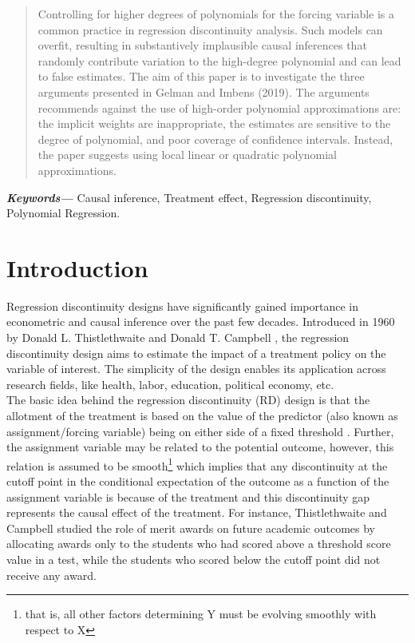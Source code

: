 \documentclass[fleqn]{article}
\providecommand{\keywords}[1]
{
  \small	
  \textbf{\textit{Keywords---}} #1
}
\begin{document}
\begin{abstract}
     Controlling for higher degrees of polynomials for the forcing variable is a common practice in regression discontinuity analysis. Such models can overfit, resulting in substantively implausible causal inferences that randomly contribute variation to the high-degree polynomial and can lead to false estimates. The aim of this paper is to investigate the three arguments presented in Gelman and Imbens (2019)\cite{gelman2019high}. The arguments recommends against the use of high-order polynomial approximations are: the implicit weights are inappropriate, the estimates are sensitive to the degree of polynomial, and poor coverage of confidence intervals. Instead, the paper suggests using local linear or quadratic polynomial approximations.
\end{abstract}\hspace{10pt}

\keywords {Causal inference, Treatment effect, Regression discontinuity, Polynomial Regression.}

\section{Introduction}
\label{sec:intro}


    Regression discontinuity designs have significantly gained importance in econometric and causal inference over the past few decades. Introduced in 1960 by Donald L. Thistlethwaite and Donald T. Campbell \cite{thistlethwaite1960regression}, the regression discontinuity design aims to estimate the impact of a treatment policy on the variable of interest. The simplicity of the design enables its application across research fields, like health, labor, education, political economy, etc. \\

    The basic idea behind the regression discontinuity (RD) design is that the allotment of the treatment is based on the value of the predictor (also known as assignment/forcing variable) being on either side of a fixed threshold \cite{imbens2008regression}. Further, the assignment variable may be related to the potential outcome, however, this relation is assumed to be smooth\footnote{that is, all other factors determining Y must be evolving smoothly with respect to X} which implies that any discontinuity at the cutoff point in the conditional expectation of the outcome as a function of the assignment variable is because of the treatment and this discontinuity gap represents the causal effect of the treatment. For instance, Thistlethwaite and Campbell \cite{thistlethwaite1960regression} studied the role of merit awards on future academic outcomes by allocating awards only to the students who had scored above a threshold score value in a test, while the students who scored below the cutoff point did not receive any award. \\
\end{document}
